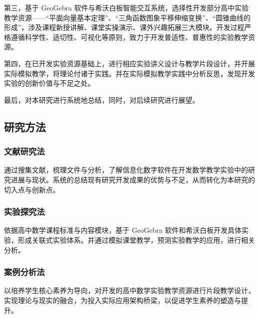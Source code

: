 第三，基于 GeoGebra 软件与希沃白板智能交互系统，选择性开发部分高中实验教学资源——“平面向量基本定理”、“三角函数图象平移伸缩变换”、“圆锥曲线的形成”，涉及课程新授讲解、课堂实操演示、课外兴趣拓展三大模块。开发过程严格遵循科学性、适切性、可视化等原则，致力于开发普适性、普惠性的实验教学资源。

第四，在已开发实验资源基础上，进行相应实验讲义设计与教学片段设计，并开展实际模拟教学，将理论付诸于实践。并在实际模拟教学实践中分析反思，发现开发实验的创新价值与不足之处。

最后，对本研究进行系统地总结，同时，对后续研究进行展望。

\subsection{研究方法}

\subsubsection{文献研究法}

通过搜集文献，梳理文件与分析，了解信息化数字软件在开发数学教学实验中的研究进展与现状。系统的总结现有研究开发成果的优势与不足，从而转化为本研究的切入点与创新点。

\subsubsection{实验探究法}

依据高中数学课程标准与内容模块，基于 GeoGebra 软件和希沃白板开发具体实验，形成关联式实验体系。并通过模拟课堂教学，预测实验教学的应用，进行相关分析。

\subsubsection{案例分析法}

以培养学生核心素养为导向，对开发的高中数学实验教学资源进行片段教学设计，实现理论与现实的融合，为投入实际应用架构桥梁，以促进学生素养的塑造与提升。
